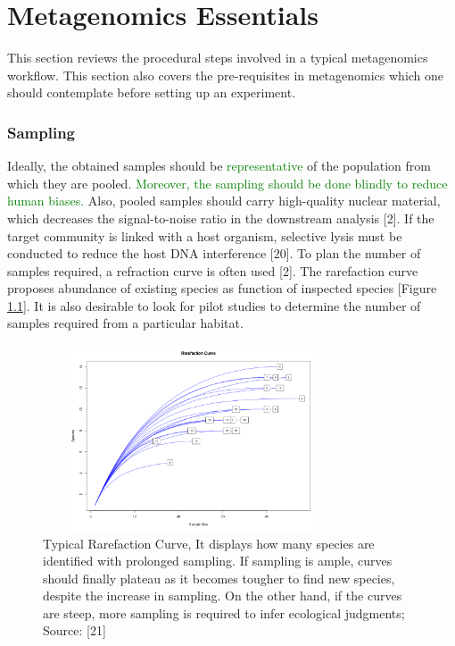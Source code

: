 \chapter{Metagenomics Essentials}
 \setcounter{page}{4}

This section reviews the procedural steps involved in a typical metagenomics workflow. This section also covers the pre-requisites in metagenomics which one should contemplate before setting up an experiment.

\subsection{Sampling}
Ideally, the obtained samples should be \textcolor{green}{representative} of the population from which they are pooled. \textcolor{green}{Moreover, the sampling should be done blindly to reduce human biases.} Also, pooled samples should carry high-quality nuclear material, which decreases the signal-to-noise ratio in the downstream analysis [2]. If the target community is linked with a host organism, selective lysis must be conducted to reduce the host DNA interference [20]. To plan the number of samples required, a refraction curve is often used [2]. The rarefaction curve proposes abundance of existing species as function of inspected species [Figure \ref{fig:figure1}]. It is also desirable to look for pilot studies to determine the number of samples required from a particular habitat.

\begin{figure}
  \centering
  \includegraphics[width=9cm, height=5.5cm] {../figures/Figure1.png}
  \caption{Typical Rarefaction Curve, It displays how many species are identified with prolonged sampling. If sampling is ample, curves should finally plateau as it becomes tougher to find new species, despite the increase in sampling. On the other hand, if the curves are steep, more sampling is required to infer ecological judgments; Source: [21]}
  \label{fig:figure1}
\end{figure}

